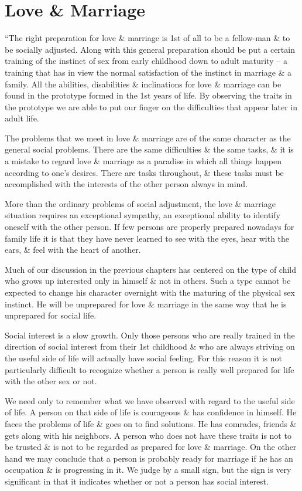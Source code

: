 \documentclass{article}
\begin{document}

\section{Love \& Marriage}
``The right preparation for love \& marriage is 1st of all to be a fellow-man \& to be socially adjusted. Along with this general preparation should be put a certain training of the instinct of sex from early childhood down to adult maturity -- a training that has in view the normal satisfaction of the instinct in marriage \& a family. All the abilities, disabilities \& inclinations for love \& marriage can be found in the prototype formed in the 1st years of life. By observing the traits in the prototype we are able to put our finger on the difficulties that appear later in adult life.

The problems that we meet in love \& marriage are of the same character as the general social problems. There are the same difficulties \& the same tasks, \& it is a mistake to regard love \& marriage as a paradise in which all things happen according to one's desires. There are tasks throughout, \& these tasks must be accomplished with the interests of the other person always in mind.

More than the ordinary problems of social adjustment, the love \& marriage situation requires an exceptional sympathy, an exceptional ability to identify oneself with the other person. If few persons are properly prepared nowadays for family life it is that they have never learned to see with the eyes, hear with the ears, \& feel with the heart of another.

Much of our discussion in the previous chapters has centered on the type of child who grows up interested only in himself \& not in others. Such a type cannot be expected to change his character overnight with the maturing of the physical sex instinct. He will be unprepared for love \& marriage in the same way that he is unprepared for social life.

Social interest is a slow growth. Only those persons who are really trained in the direction of social interest from their 1st childhood \& who are always striving on the useful side of life will actually have social feeling. For this reason it is not particularly difficult to recognize whether a person is really well prepared for life with the other sex or not.

We need only to remember what we have observed with regard to the useful side of life. A person on that side of life is courageous \& has confidence in himself. He faces the problems of life \& goes on to find solutions. He has comrades, friends \& gets along with his neighbors. A person who does not have these traits is not to be trusted \& is not to be regarded as prepared for love \& marriage. On the other hand we may conclude that a person is probably ready for marriage if he has an occupation \& is progressing in it. We judge by a small sign, but the sign is very significant in that it indicates whether or not a person has social interest.
\end{document}
